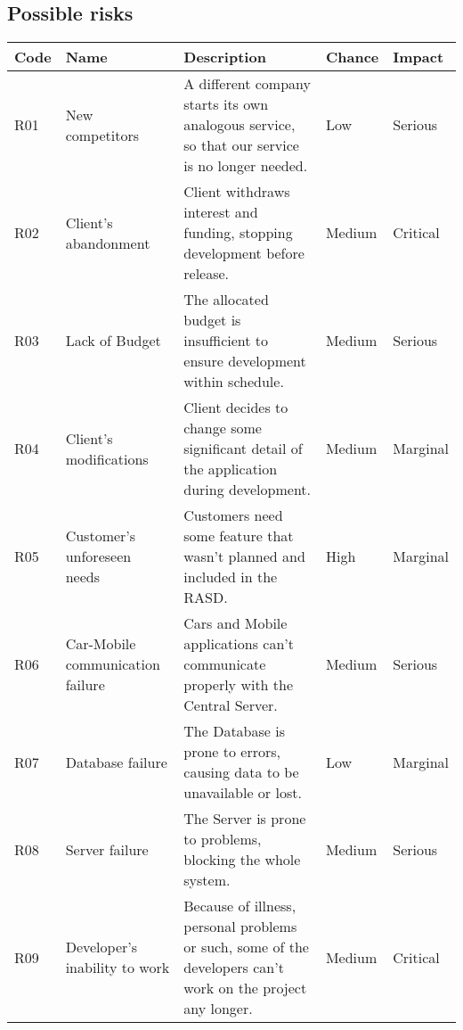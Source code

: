 \subsection{Possible risks}

\begin{tabular}{|p{}|p{}|p{}|l|l|}
\hline
\textbf{Code} & \textbf{Name} & \textbf{Description} & \textbf{Chance} & \textbf{Impact} \\ \hline
R01 & New competitors & A different company starts its own analogous service, so that our service is no longer needed. & Low & Serious \\ \hline
R02 & Client's abandonment & Client withdraws interest and funding, stopping development before release. & Medium & Critical \\ \hline
R03 & Lack of Budget & The allocated budget is insufficient to ensure development within schedule. & Medium & Serious \\ \hline
R04 & Client's modifications & Client decides to change some significant detail of the application during development. & Medium & Marginal \\ \hline
R05 & Customer's unforeseen needs & Customers need some feature that wasn't planned and included in the RASD. & High & Marginal \\ \hline
R06 & Car-Mobile communication failure & Cars and Mobile applications can't communicate properly with the Central Server. & Medium & Serious \\ \hline
R07 & Database failure & The Database is prone to errors, causing data to be unavailable or lost. & Low & Marginal \\ \hline
R08 & Server failure & The Server is prone to problems, blocking the whole system. & Medium & Serious \\ \hline
R09 & Developer's inability to work & Because of illness, personal problems or such, some of the developers can't work on the project any longer. & Medium & Critical \\ \hline
\end{tabular}

\clearpage
